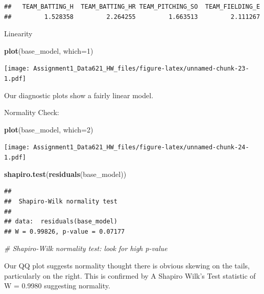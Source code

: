 \documentclass[
]{article}
\newenvironment{Shaded}{\begin{snugshade}}{\end{snugshade}}
\newcommand{\AttributeTok}[1]{\textcolor[rgb]{0.13,0.29,0.53}{#1}}
\newcommand{\CommentTok}[1]{\textcolor[rgb]{0.56,0.35,0.01}{\textit{#1}}}
\newcommand{\DecValTok}[1]{\textcolor[rgb]{0.00,0.00,0.81}{#1}}
\newcommand{\FunctionTok}[1]{\textcolor[rgb]{0.13,0.29,0.53}{\textbf{#1}}}
\newcommand{\NormalTok}[1]{#1}
\begin{document}
\begin{verbatim}
##   TEAM_BATTING_H  TEAM_BATTING_HR TEAM_PITCHING_SO  TEAM_FIELDING_E 
##         1.528358         2.264255         1.663513         2.111267
\end{verbatim}

Linearity

\begin{Shaded}
\begin{Highlighting}[]
\FunctionTok{plot}\NormalTok{(base\_model, }\AttributeTok{which=}\DecValTok{1}\NormalTok{)}
\end{Highlighting}
\end{Shaded}

\texttt{[image: Assignment1\_Data621\_HW\_files/figure-latex/unnamed-chunk-23-1.pdf]}

Our diagnostic plots show a fairly linear model.

Normality Check:

\begin{Shaded}
\begin{Highlighting}[]
\FunctionTok{plot}\NormalTok{(base\_model, }\AttributeTok{which=}\DecValTok{2}\NormalTok{)}
\end{Highlighting}
\end{Shaded}

\texttt{[image: Assignment1\_Data621\_HW\_files/figure-latex/unnamed-chunk-24-1.pdf]}

\begin{Shaded}
\begin{Highlighting}[]
\FunctionTok{shapiro.test}\NormalTok{(}\FunctionTok{residuals}\NormalTok{(base\_model))}
\end{Highlighting}
\end{Shaded}

\begin{verbatim}
## 
##  Shapiro-Wilk normality test
## 
## data:  residuals(base_model)
## W = 0.99826, p-value = 0.07177
\end{verbatim}

\begin{Shaded}
\begin{Highlighting}[]
\CommentTok{\# Shapiro{-}Wilk normality test: look for high p{-}value}
\end{Highlighting}
\end{Shaded}

Our QQ plot suggests normality thought there is obvious skewing on the
tails, particularly on the right. This is confirmed by A Shapiro Wilk's
Test statistic of W = 0.9980 suggesting normality.
\end{document}

